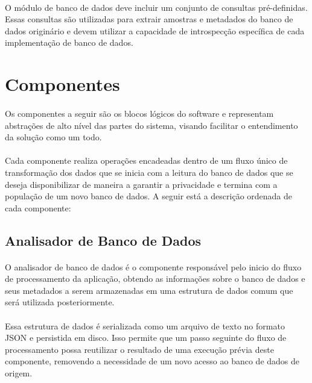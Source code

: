 \paragraph{} O módulo de banco de dados deve incluir um conjunto de consultas pré-definidas. Essas consultas são utilizadas para extrair amostras e metadados do banco de dados originário e devem utilizar a capacidade de introspecção específica de cada implementação de banco de dados.

\section{Componentes}

\paragraph{} Os componentes a seguir são os blocos lógicos do software e representam abstrações de alto nível das partes do sistema, visando facilitar o entendimento da solução como um todo.

\paragraph{} Cada componente realiza operações encadeadas dentro de um fluxo único de transformação dos dados que se inicia com a leitura do banco de dados que se deseja disponibilizar de maneira a garantir a privacidade e termina com a população de um novo banco de dados. A seguir está a descrição ordenada de cada componente:

\subsection{Analisador de Banco de Dados}

\paragraph{} O analisador de banco de dados é o componente responsável pelo inicio do fluxo de processamento da aplicação, obtendo as informações sobre o banco de dados e seus metadados a serem armazenadas em uma estrutura de dados comum que será utilizada posteriormente.

\paragraph{} Essa estrutura de dados é serializada como um arquivo de texto no formato JSON e persistida em disco. Isso permite que um passo seguinte do fluxo de processamento possa reutilizar o resultado de uma execução prévia deste componente, removendo a necessidade de um novo acesso ao banco de dados de origem.

